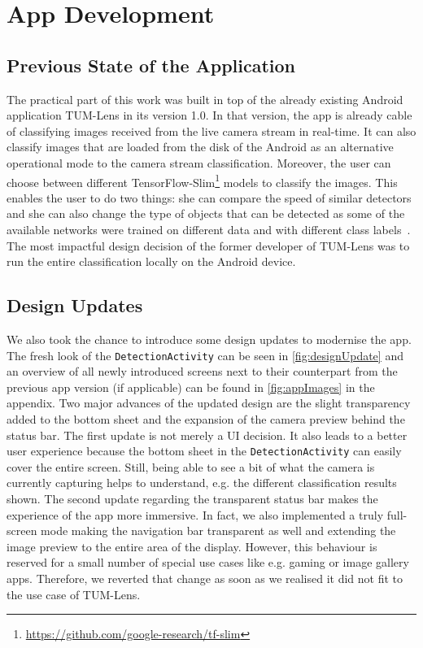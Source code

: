 \documentclass[
			   fontsize=11pt,
               paper=a4,
               bibliography=totoc,
               idxtotoc,
               headsepline,
               footsepline,
               footinclude=false,
               BCOR=12mm,
               DIV=13,
               openany,   %
               ]
               {scrbook}
\newcommand{\code}[1]{\lstinline[basicstyle = \ttfamily\small]{#1}} %
\begin{document}

\part{App Development}

\chapter{Previous State of the Application} \label{sec:previousState}

The practical part of this work was built in top of the already existing Android application TUM-Lens in its version 1.0. In that version, the app is already cable of classifying images received from the live camera stream in real-time. It can also classify images that are loaded from the disk of the Android as an alternative operational mode to the camera stream classification. Moreover, the user can choose between different TensorFlow-Slim\footnote{\url{https://github.com/google-research/tf-slim}} models to classify the images. This enables the user to do two things: she can compare the speed of similar detectors and she can also change the type of objects that can be detected as some of the available networks were trained on different data and with different class labels~\cite{maxJokel}. The most impactful design decision of the former developer of TUM-Lens was to run the entire classification locally on the Android device.

\chapter{Design Updates}

We also took the chance to introduce some design updates to modernise the app. The fresh look of the \code{DetectionActivity} can be seen in \autoref{fig:designUpdate} and an overview of all newly introduced screens next to their counterpart from the previous app version (if applicable) can be found in \autoref{fig:appImages} in the appendix. Two major advances of the updated design are the slight transparency added to the bottom sheet and the expansion of the camera preview behind the status bar. The first update is not merely a UI decision. It also leads to a better user experience because the bottom sheet in the \code{DetectionActivity} can easily cover the entire screen. Still, being able to see a bit of what the camera is currently capturing helps to understand, e.g. the different classification results shown. The second update regarding the transparent status bar makes the experience of the app more immersive. In fact, we also implemented a truly full-screen mode making the navigation bar transparent as well and extending the image preview to the entire area of the display. However, this behaviour is reserved for a small number of special use cases like e.g. gaming or image gallery apps. Therefore, we reverted that change as soon as we realised it did not fit to the use case of TUM-Lens.
\end{document}
